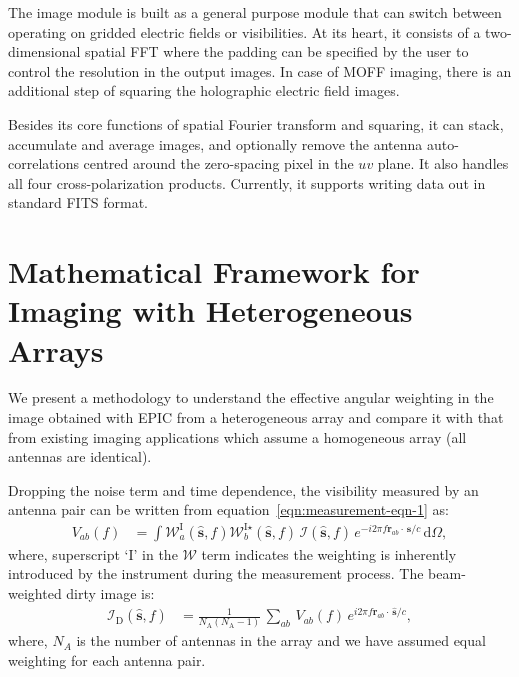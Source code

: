 \documentclass[a4paper,fleqn,usenatbib]{mnras}
\newcommand{\Nant}{N_\textrm{A}}
\newcommand{\dif}{\mathrm{d}}
\begin{document}
The image module is built as a general purpose module that can switch between operating on gridded electric fields or visibilities. At its heart, it consists of a two-dimensional spatial FFT where the padding can be specified by the user to control the resolution in the output images. In case of MOFF imaging, there is an additional step of squaring the holographic electric field images. 

Besides its core functions of spatial Fourier transform and squaring, it can stack, accumulate and average images, and optionally remove the antenna auto-correlations centred around the zero-spacing pixel in the $uv$ plane. It also handles all four cross-polarization products. Currently, it supports writing data out in standard FITS format. 

\section{Mathematical Framework for Imaging with Heterogeneous Arrays}\label{sec:math-versatility}

We present a methodology to understand the effective angular weighting in the image obtained with EPIC from a heterogeneous array and compare it with that from existing imaging applications which assume a homogeneous array (all antennas are identical). %

Dropping the noise term and time dependence, the visibility measured by an antenna pair can be written from equation~\ref{eqn:measurement-eqn-1} as:
\begin{align}\label{eqn:apndx-measurement-eqn-2}
  V_{ab}(f) &= \int \mathcal{W}^\textrm{I}_a(\hat{\mathbf{s}},f)\mathcal{W}^{\textrm{I}\star}_b(\hat{\mathbf{s}},f)\,\mathcal{I}(\hat{\mathbf{s}},f)\,e^{-i 2\pi f\mathbf{r}_{ab}\!\cdot\,\hat{\mathbf{s}}/c}\,\dif\Omega,
\end{align}
where, superscript `$\textrm{I}$' in the $\mathcal{W}$ term indicates the weighting is inherently introduced by the instrument during the measurement process. The beam-weighted dirty image is:
\begin{align}
  \mathcal{I}_\textrm{D}(\hat{\mathbf{s}},f) &= \frac{1}{\Nant(\Nant-1)}\,\sum_{ab}\, V_{ab}(f)\,e^{i 2\pi f\mathbf{r}_{ab}\!\cdot\,\hat{\mathbf{s}}/c},
\end{align}
where, $N_A$ is the number of antennas in the array and we have assumed equal weighting for each antenna pair.
\end{document}
